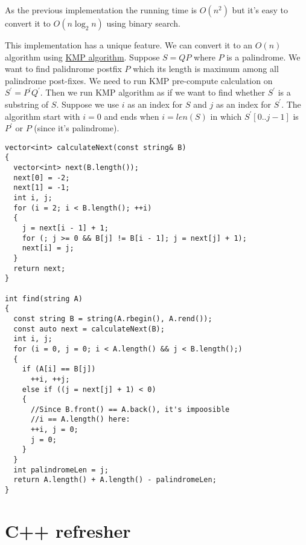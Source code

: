 \documentclass{book}
\begin{document}
	As the previous implementation the running time is $O(n^2)$ but it's easy to convert it to $O(n\log_2n)$ using binary search.
	\par This implementation has a unique feature. We can convert it to an $O(n)$ algorithm using \href{https://en.wikipedia.org/wiki/Knuth%E2%80%93Morris%E2%80%93Pratt_algorithm}{KMP algorithm}. Suppose $S=QP$ where $P$ is a palindrome. We want to find palidnrome postfix $P$ which its length is maximum among all palindrome post-fixes. We need to run KMP pre-compute calculation on $S^\prime = P^\prime Q^\prime$. Then we run KMP algorithm as if we want to find whether $S^\prime$ is a substring of $S$. Suppose we use $i$ as an index for $S$ and $j$ as an index for $S^\prime$. The algorithm start with $i = 0$ and ends when $i = len(S)$ in which $S^\prime[0..j - 1]$ is $P^\prime$ or $P$ (since it's palindrome).
	
	\begin{lstlisting}
vector<int> calculateNext(const string& B)
{
  vector<int> next(B.length());
  next[0] = -2;
  next[1] = -1;
  int i, j;
  for (i = 2; i < B.length(); ++i)
  {
    j = next[i - 1] + 1;
    for (; j >= 0 && B[j] != B[i - 1]; j = next[j] + 1);
    next[i] = j;
  }
  return next;
}

int find(string A)
{
  const string B = string(A.rbegin(), A.rend());
  const auto next = calculateNext(B);
  int i, j;
  for (i = 0, j = 0; i < A.length() && j < B.length();)
  {
    if (A[i] == B[j])
      ++i, ++j;
    else if ((j = next[j] + 1) < 0)
    {
      //Since B.front() == A.back(), it's impoosible
      //i == A.length() here:
      ++i, j = 0;
      j = 0;
    }
  }
  int palindromeLen = j;
  return A.length() + A.length() - palindromeLen; 
}	
	\end{lstlisting}
	\appendix
	\chapter{C++ refresher}
\end{document}

